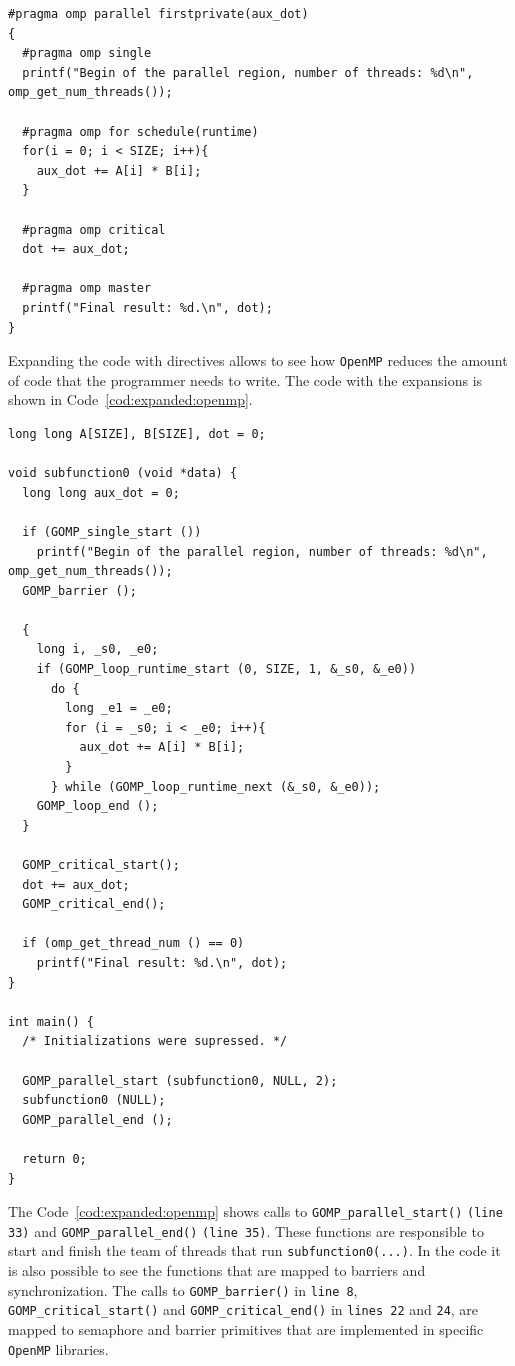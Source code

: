 \begin{lstlisting}[style=C, label=cod:sample:openmp,caption=Sample of OpenMP code.]
#pragma omp parallel firstprivate(aux_dot)
{
  #pragma omp single
  printf("Begin of the parallel region, number of threads: %d\n", omp_get_num_threads());
    
  #pragma omp for schedule(runtime)
  for(i = 0; i < SIZE; i++){ 
    aux_dot += A[i] * B[i];
  }
    
  #pragma omp critical
  dot += aux_dot;
    
  #pragma omp master
  printf("Final result: %d.\n", dot);
}
\end{lstlisting}

Expanding the code with directives allows to see how \texttt{OpenMP} reduces the amount of code that the programmer needs to write. The code with the expansions is shown in Code~\ref{cod:expanded:openmp}.

\begin{lstlisting}[style=C, label=cod:expanded:openmp,caption=OpenMP expanded code]
long long A[SIZE], B[SIZE], dot = 0;

void subfunction0 (void *data) {
  long long aux_dot = 0;
  
  if (GOMP_single_start ())
    printf("Begin of the parallel region, number of threads: %d\n", omp_get_num_threads());
  GOMP_barrier ();
  
  {
    long i, _s0, _e0;
    if (GOMP_loop_runtime_start (0, SIZE, 1, &_s0, &_e0))
      do {
        long _e1 = _e0;
        for (i = _s0; i < _e0; i++){
          aux_dot += A[i] * B[i];
        }
      } while (GOMP_loop_runtime_next (&_s0, &_e0));
    GOMP_loop_end ();
  }
  
  GOMP_critical_start();
  dot += aux_dot;
  GOMP_critical_end();
    
  if (omp_get_thread_num () == 0)
    printf("Final result: %d.\n", dot);
}

int main() {
  /* Initializations were supressed. */

  GOMP_parallel_start (subfunction0, NULL, 2);
  subfunction0 (NULL);
  GOMP_parallel_end ();

  return 0;
}
\end{lstlisting}

The Code~\ref{cod:expanded:openmp} shows calls to \texttt{GOMP\_parallel\_start()} \texttt{(line 33)} and \texttt{GOMP\_parallel\_end()} \texttt{(line 35)}. These functions are responsible to start and finish the team of threads that run \texttt{subfunction0(...)}. In the code it is also possible to see the functions that are mapped to barriers and synchronization. The calls to \texttt{GOMP\_barrier()} in \texttt{line 8}, \texttt{GOMP\_critical\_start()} and \texttt{GOMP\_critical\_end()} in \texttt{lines 22} and \texttt{24}, are mapped to semaphore and barrier primitives that are implemented in specific \texttt{OpenMP} libraries. 

